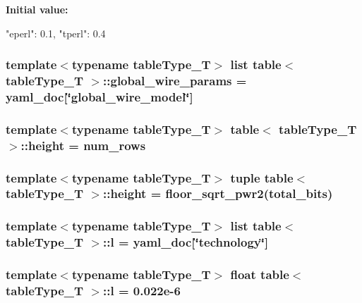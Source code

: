 \label{classtable_afa4455260ca054710631a16d93ad1848}
{\bfseries Initial value:}
\begin{DoxyCode}
{"eperl": 0.1,
                          "tperl": 0.4}
\end{DoxyCode}
\hypertarget{classtable_a9dce6b1c97baf3ee2ce1c6fe2e90cf78}{
\subsubsection[{global\_\-wire\_\-params}]{\setlength{\rightskip}{0pt plus 5cm}template$<$typename tableType\_\-T$>$ list {\bf table}$<$ tableType\_\-T $>$::{\bf global\_\-wire\_\-params} = {\bf yaml\_\-doc}\mbox{[}\char`\"{}global\_\-wire\_\-model\char`\"{}\mbox{]}}}
\label{classtable_a9dce6b1c97baf3ee2ce1c6fe2e90cf78}
\hypertarget{classtable_a628b981914a21493ea597a94f86d6a4e}{
\subsubsection[{height}]{\setlength{\rightskip}{0pt plus 5cm}template$<$typename tableType\_\-T$>$ {\bf table}$<$ tableType\_\-T $>$::{\bf height} = {\bf num\_\-rows}}}
\label{classtable_a628b981914a21493ea597a94f86d6a4e}
\hypertarget{classtable_aaf6197846462252e233815256c59795a}{
\subsubsection[{height}]{\setlength{\rightskip}{0pt plus 5cm}template$<$typename tableType\_\-T$>$ tuple {\bf table}$<$ tableType\_\-T $>$::{\bf height} = floor\_\-sqrt\_\-pwr2({\bf total\_\-bits})}}
\label{classtable_aaf6197846462252e233815256c59795a}
\hypertarget{classtable_ac52d431b62e008aea842db9c5a74c826}{
\subsubsection[{l}]{\setlength{\rightskip}{0pt plus 5cm}template$<$typename tableType\_\-T$>$ list {\bf table}$<$ tableType\_\-T $>$::{\bf l} = {\bf yaml\_\-doc}\mbox{[}\char`\"{}technology\char`\"{}\mbox{]}}}
\label{classtable_ac52d431b62e008aea842db9c5a74c826}
\hypertarget{classtable_a1a42a6604769284e9187575b0abc876d}{
\subsubsection[{l}]{\setlength{\rightskip}{0pt plus 5cm}template$<$typename tableType\_\-T$>$ float {\bf table}$<$ tableType\_\-T $>$::{\bf l} = 0.022e-\/6}}

